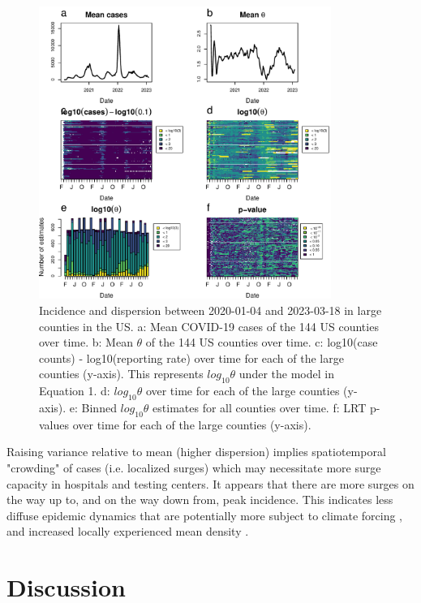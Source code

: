 \documentclass[10pt,letterpaper]{article}
\begin{document}
\begin{figure}[!h]
\centering
\includegraphics[width=0.85\textwidth]{fig3.pdf}
\caption{
Incidence and dispersion between 2020-01-04 and 2023-03-18 in large counties in the US. a: Mean COVID-19 cases of the 144 US counties over time. b: Mean $\theta$ of the 144 US counties over time. c: log10(case counts) - log10(reporting rate) over time for each of the large counties (y-axis). This represents $log_{10}\theta$ under the model in Equation 1. d: $log_{10}\theta$ over time for each of the large counties (y-axis). e: Binned $log_{10}\theta$ estimates for all counties over time. f: LRT p-values over time for each of the large counties (y-axis).
}
\label{fig3}
\end{figure}

Raising variance relative to mean (higher dispersion) implies spatiotemporal "crowding" of cases (i.e. localized surges) which may necessitate more surge capacity in hospitals and testing centers. 
It appears that there are more surges on the way up to, and on the way down from, peak incidence. 
This indicates less diffuse epidemic dynamics that are potentially more subject to climate forcing \cite{dalziel_urbanization_2018}, and increased locally experienced mean density \cite{lloyd_mean_1967}. 

\section*{Discussion}
\end{document}
